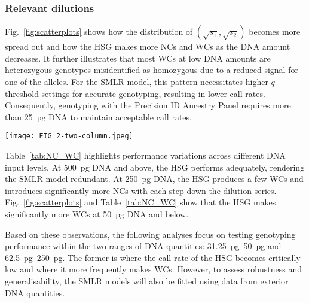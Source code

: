 \documentclass[preprint,5p,times,11pt]{elsarticle}
\begin{document}
\subsubsection{Relevant dilutions}
Fig.~\ref{fig:scatterplots} shows how the distribution of $\left(\sqrt{s_1}, \sqrt{s_2}\right)$ becomes more spread out and how the HSG makes more NCs and WCs as the DNA amount decreases.
It further illustrates that most WCs at low DNA amounts are heterozygous genotypes misidentified as homozygous due to a reduced signal for one of the alleles.
For the SMLR model, this pattern necessitates higher $q$-threshold settings for accurate genotyping, resulting in lower call rates.
Consequently, genotyping with the Precision ID Ancestry Panel requires more than \SI{25}{\pg} DNA to maintain acceptable call rates.
\begin{figure*}
\centering
\texttt{[image: FIG\_2-two-column.jpeg]}
\caption{
Distribution of square-root transformed allele signals.\\
A dot represents a pair of SNP read counts $\left(s_1, s_2\right)$.
The true genotypes are coloured red for heterozygotes and blue or yellow for homozygotes.
The displayed DNA quantities indicate where the accuracy of the HID SNP Genotyper Plugin falls below 100\%, with its wrong calls marked by red crosses and no-calls by black pluses.
}
\label{fig:scatterplots}
\end{figure*}

Table~\ref{tab:NC_WC} highlights performance variations across different DNA input levels.
At \SI{500}{\pg} DNA and above, the HSG performs adequately, rendering the SMLR model redundant.
At \SI{250}{\pg} DNA, the HSG produces a few WCs and introduces significantly more NCs with each step down the dilution series.
Fig.~\ref{fig:scatterplots} and Table~\ref{tab:NC_WC} show that the HSG makes significantly more WCs at \SI{50}{\pg} DNA and below.

Based on these observations, the following analyses focus on testing genotyping performance within the two ranges of DNA quantities: \SIrange[range-units = single, range-phrase = --]{31.25}{50}{\pg} and \SIrange[range-units = single, range-phrase = --]{62.5}{250}{\pg}.
The former is where the call rate of the HSG becomes critically low and where it more frequently makes WCs.
However, to assess robustness and generalisability, the SMLR models will also be fitted using data from exterior DNA quantities.
\end{document}
